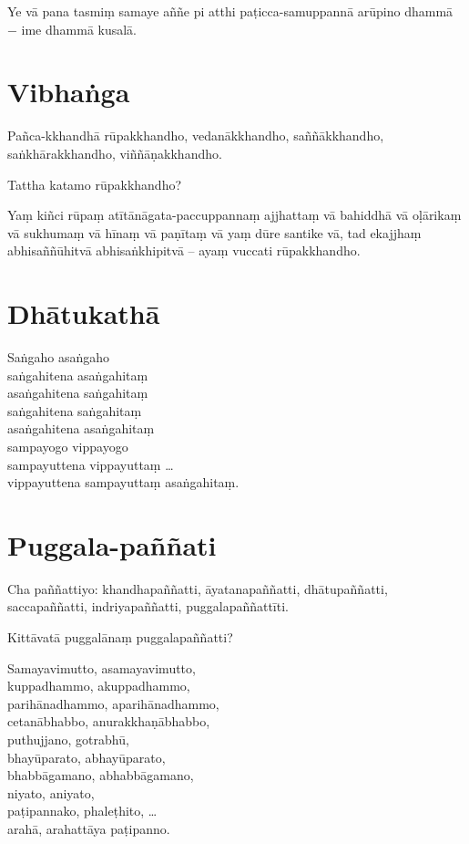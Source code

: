 Ye vā pana tasmiṃ samaye aññe pi atthi paṭicca-samuppannā arūpino dhammā − ime
dhammā kusalā.


\section{Vibhaṅga}

Pañca-kkhandhā rūpakkhandho, vedanākkhandho, saññākkhandho, saṅkhārakkhandho,
viññāṇakkhandho.

Tattha katamo rūpakkhandho?

Yaṃ kiñci rūpaṃ atītānāgata-paccuppannaṃ ajjhattaṃ vā bahiddhā vā oḷārikaṃ vā
sukhumaṃ vā hīnaṃ vā paṇītaṃ vā yaṃ dūre santike vā, tad ekajjhaṃ
abhisaññūhitvā abhisaṅkhipitvā -- ayaṃ vuccati rūpakkhandho.


\section{Dhātukathā}

Saṅgaho asaṅgaho\\
saṅgahitena asaṅgahitaṃ\\
asaṅgahitena saṅgahitaṃ\\
saṅgahitena saṅgahitaṃ\\
asaṅgahitena asaṅgahitaṃ\\
sampayogo vippayogo\\
sampayuttena vippayuttaṃ \ldots\\
vippayuttena sampayuttaṃ asaṅgahitaṃ.


\section{Puggala-paññati}

Cha paññattiyo: khandhapaññatti, āyatanapaññatti, dhātupaññatti, saccapaññatti,
indriyapaññatti, puggalapaññattīti.

Kittāvatā puggalānaṃ puggalapaññatti?

Samayavimutto, asamayavimutto,\\
kuppadhammo, akuppadhammo,\\
parihānadhammo, aparihānadhammo,\\
cetanābhabbo, anurakkhaṇābhabbo,\\
puthujjano, gotrabhū,\\
bhayūparato, abhayūparato,\\
bhabbāgamano, abhabbāgamano,\\
niyato, aniyato,\\
paṭipannako, phaleṭhito, \ldots\\
arahā, arahattāya paṭipanno.

